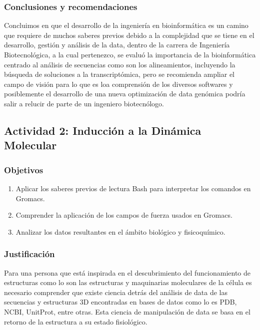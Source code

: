 \documentclass[a4paper,12pt]{article}
\begin{document}
           
        \subsubsection{Conclusiones y recomendaciones}
        Concluimos en que el desarrollo de la ingeniería en bioinformática es un camino que requiere de muchos saberes previos debido a la complejidad que se tiene en el desarrollo, gestión y análisis de la data, dentro de la carrera de Ingeniería Biotecnológica, a la cual pertenezco, se evaluó la importancia de la bioinformática centrado al análisis de secuencias como son los alineamientos, incluyendo la búsqueda de soluciones a la transcriptómica, pero se recomienda ampliar el campo de visión para lo que es loa comprensión de los diversos softwares y posiblemente el desarrollo de una nueva optimización de data genómica podría salir a relucir de parte de un ingeniero biotecnólogo.

    \subsection{Actividad 2: Inducción a la Dinámica Molecular}

         \subsubsection{Objetivos} 
            \begin{enumerate}
                \item Aplicar los saberes previos de lectura Bash para interpretar los comandos en Gromacs.
                \item Comprender la aplicación de los campos de fuerza usados en Gromacs.
                \item Analizar los datos resultantes en el ámbito biológico y fisicoquímico.
            \end{enumerate}

         \subsubsection{Justificación}
         Para una persona que está inspirada en el descubrimiento del funcionamiento de estructuras como lo son las estructuras y maquinarias moleculares de la célula es necesario comprender que existe ciencia detrás del análisis de data de las secuencias y estructuras 3D encontradas en bases de datos como lo es PDB, NCBI, UnitProt, entre otras. Esta ciencia de manipulación de data se basa en el retorno de la estructura a su estado fisiológico.
         
\end{document}
